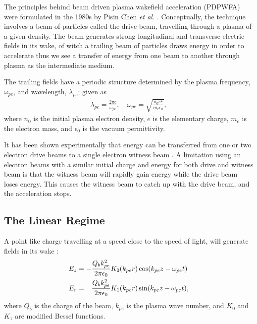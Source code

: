 The principles behind beam driven plasma wakefield acceleration (PDPWFA) were formulated in the 1980s by Pisin Chen \emph{et al.} \cite{chen:1985}. Conceptually, the technique involves a beam of particles called the drive beam, travelling through a plasma of a given density. The beam generates strong longitudinal and transverse electric fields in its wake, of witch a trailing beam of particles draws energy in order to accelerate \dash thus we see a transfer of energy from one beam to another through plasma as the intermediate medium.

The trailing fields have a periodic structure determined by the plasma frequency, $\omega_{pe}$, and wavelength, $\lambda_{pe}$; given as
\begin{align}
    \lambda_{pe} = \frac{2\pi c}{\omega_{pe}}, \quad \omega_{pe} = \sqrt{\frac{n_{0}e^{2}}{m_{e}\epsilon_{0}}}, \label{EQ:PWFA:L0W0}
\end{align}
where $n_{0}$ is the initial plasma electron density, $e$ is the elementary charge, $m_{e}$ is the electron mass, and $\epsilon_{0}$ is the vacuum permittivity.

It has been shown experimentally that energy can be transferred from one or two electron drive beams to a single electron witness beam \cite{rosenzweig:1988, blumenfeld:2007, kallos:2008, litos:2014}. A limitation using an electron beams with a similar initial charge and energy for both drive and witness beam is that the witness beam will rapidly gain energy while the drive beam loses energy. This causes the witness beam to catch up with the drive beam, and the acceleration stops. 

\subsection{The Linear Regime}
\label{Int:PWFA:Lin}

A point like charge travelling at a speed close to the speed of light, will generate fields in its wake \cite{van_der_meer:1985,chen:1985}:
\begin{align}
    E_{z} &=            - \frac{Q_{b}k_{pe}^{2}}{2\pi\epsilon_{0}} K_{0}(k_{pe}r)\cos(k_{pe}z - \omega_{pe}t)
                          \label{EQ:PWFA:EZ} \\
    E_{r} &= \hphantom{-} \frac{Q_{b}k_{pe}^{2}}{2\pi\epsilon_{0}} K_{1}(k_{pe}r)\sin(k_{pe}z - \omega_{pe}t),
                          \label{EQ:PWFA:ER}
\end{align}
where $Q_{b}$ is the charge of the beam, $k_{pe}$ is the plasma wave number, and $K_{0}$ and $K_{1}$ are modified Bessel functions. 

